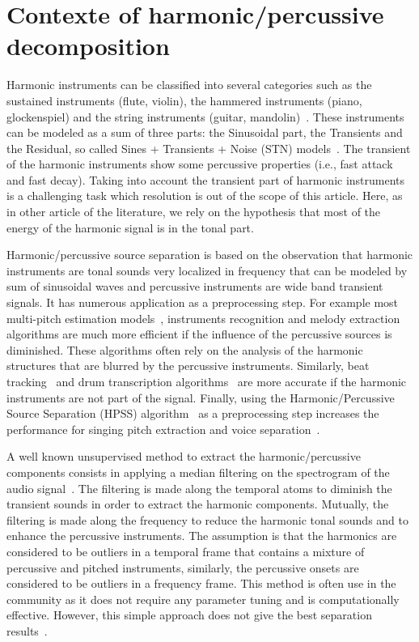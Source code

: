 \section{Contexte of harmonic/percussive decomposition}
\label{sec:Background}


Harmonic instruments can be classified into several categories such as the sustained instruments (flute, violin), the hammered instruments (piano, glockenspiel) and the string instruments (guitar, mandolin)~\cite{peeters2003automatic,peeters2003hierarchical}. These instruments can be modeled as a sum of three parts: the Sinusoidal part, the Transients and the Residual, so called  Sines + Transients + Noise (STN) models~\cite{daudet2006review}. The transient of the harmonic instruments show some percussive properties (i.e., fast attack and fast decay). Taking into account the transient part of harmonic instruments is a challenging task which resolution is out of the scope of this article. Here, as in other article of the literature, we rely on the hypothesis that most of the energy of the harmonic signal is in the tonal part. 

Harmonic/percussive source separation is based on the observation that harmonic instruments are tonal sounds very localized in frequency that can be modeled by sum of sinusoidal waves and percussive instruments are wide band transient signals. It has numerous application as a preprocessing step. For example most multi-pitch estimation models~\cite{klapuri2008multipitch}, instruments recognition and melody extraction~\cite{salamon2012melody} algorithms are much more efficient if the influence of the percussive sources is diminished. These algorithms often rely on the analysis of the harmonic structures that are blurred by the percussive instruments. Similarly, beat tracking~\cite{ellis2007beat} and drum transcription algorithms~\cite{paulus2005drum} are more accurate if the harmonic instruments are not part of the signal. Finally, using the Harmonic/Percussive Source Separation (HPSS) algorithm~\cite{fitzgerald2010harmonic} as a preprocessing step increases the performance for singing pitch extraction and voice separation~\cite{hsu2012tandem}.

A well known unsupervised method to extract the harmonic/percussive components consists in applying a median filtering on the spectrogram of the audio signal~\cite{fitzgerald2010harmonic,ono2008separation}. The filtering is made along the temporal atoms to diminish the transient sounds in order to extract the harmonic components. Mutually, the filtering is made along the frequency to reduce the harmonic tonal sounds and to enhance the percussive instruments. The assumption is that the harmonics are considered to be outliers in a temporal frame that contains a mixture of percussive and pitched instruments, similarly, the percussive onsets are considered to be outliers in a frequency frame. This method is often use in the community as it does not require any parameter tuning and is computationally effective. However, this simple approach does not give the best separation results~\cite{canadas2014percussive}.

